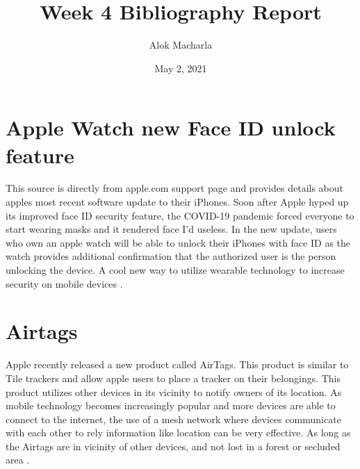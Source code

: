 \documentclass{article}
\title{Week 4 Bibliography Report}
\author{Alok Macharla}
\date{May 2, 2021}
\begin{document}
\maketitle

\section{Apple Watch new Face ID unlock feature}
This source is directly from apple.com support page and provides details about apples most recent software update to their iPhones. Soon after Apple hyped up its improved face ID security feature, the COVID-19 pandemic forced everyone to start wearing masks and it rendered face I'd useless. In the new update, users who own an apple watch will be able to unlock their iPhones with face ID as the watch provides additional confirmation that the authorized user is the person unlocking the device. A cool new way to utilize wearable technology to increase security on mobile devices \cite{apple_support_2021}.

\section{Airtags}
Apple recently released a new product called AirTags. This product is similar to Tile trackers and allow apple users to place a tracker on their belongings. This product utilizes other devices in its vicinity to notify owners of its location. As mobile technology becomes increasingly popular and more devices are able to connect to the internet, the use of a mesh network where devices communicate with each other to rely information like location can be very effective. As long as the Airtags are in vicinity of other devices, and not lost in a forest or secluded area \cite{apple_2021}.



\end{document}
